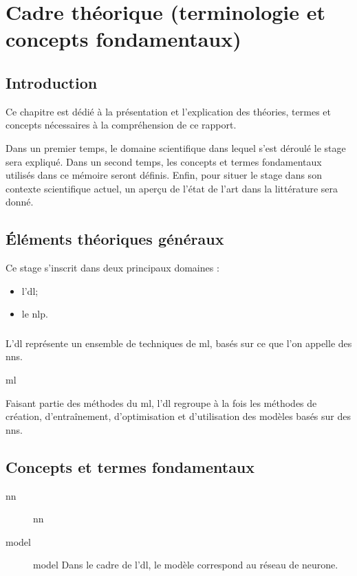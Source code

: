 \chapter[Cadre théorique]{Cadre théorique (terminologie et concepts fondamentaux) \label{ch:sci_framework}}

\section{Introduction} %
Ce chapitre est dédié à la présentation et l'explication des théories, termes et concepts nécessaires à la compréhension de ce rapport.

Dans un premier temps, le domaine scientifique dans lequel s'est déroulé le stage sera expliqué.
Dans un second temps, les concepts et termes fondamentaux utilisés dans ce mémoire seront définis.
Enfin, pour situer le stage dans son contexte scientifique actuel, un aperçu de l'état de l'art dans la littérature sera donné.

\section{Éléments théoriques généraux} %
Ce stage s'inscrit dans deux principaux domaines :
\begin{itemize}
	\item l'\gls{dl};
	\item le \gls{nlp}.
\end{itemize}

\subsection{}
L'\gls{dl} représente un ensemble de techniques de \gls{ml}, basés sur ce que l'on appelle des \glspl{nn}.

\glsdesc{ml}

Faisant partie des méthodes du \gls{ml}, l'\gls{dl} regroupe à la fois les méthodes de création, d'entraînement, d'optimisation et d'utilisation des modèles basés sur des \glspl{nn}.

\subsection{}

\section{Concepts et termes fondamentaux} %
\begin{description}
	\item[\Gls{nn}] \glsdesc{nn}
	\item[\Gls{model}] \glsdesc{model} Dans le cadre de l'\gls{dl}, le modèle correspond au réseau de neurone.
\end{description}


